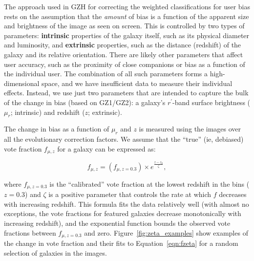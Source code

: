 \documentclass[usenatbib]{mn2e}
\begin{document}
The approach used in GZH for correcting the weighted classifications for user bias rests on the assumption that the \emph{amount} of bias is a function of the apparent size and brightness of the image as seen on screen. This is controlled by two types of parameters: \textbf{intrinsic} properties of the galaxy itself, such as its physical diameter and luminosity, and \textbf{extrinsic} properties, such as the distance (redshift) of the galaxy and its relative orientation. There are likely other parameters that affect user accuracy, such as the proximity of close companions \citep[``distraction bias''; see][]{joh15} or bias as a function of the individual user. The combination of all such parameters forms a high-dimensional space, and we have insufficient data to measure their individual effects. Instead, we use just two parameters that are intended to capture the bulk of the change in bias (based on GZ1/GZ2): a galaxy's $r^\prime$-band surface brightness ($\mu_r$; intrinsic) and redshift ($z$; extrinsic). 

The change in bias as a function of $\mu_r$ and $z$ is measured using the \ferengi{} images over all the evolutionary correction factors. We assume that the ``true'' (ie, debiased) vote fraction $f_{\mu,z}$ for a galaxy can be expressed as:

\begin{equation}
f_{\mu,z} = \left(f_{\mu,z=0.3}\right) \times e^{{\frac{z-z_0}{\zeta}}},
\label{eqn:fzeta}
\end{equation}

\noindent where $f_{\mu,z=0.3}$ is the ``calibrated'' vote fraction at the lowest redshift in the \ferengi{} bins ($z=0.3$) and $\zeta$ is a positive parameter that controls the rate at which $f$ decreases with increasing redshift. This formula fits the data relatively well (with almost no exceptions, the vote fractions for featured galaxies decrease monotonically with increasing redshift), and the exponential function bounds the observed vote fractions between $f_{\mu,z=0.3}$ and zero. Figure~\ref{fig:zeta_examples} show examples of the change in vote fraction and their fits to Equation~\ref{eqn:fzeta} for a random selection of galaxies in the \ferengi{} images. 
\end{document}
